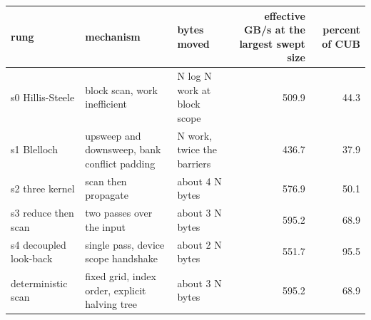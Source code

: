 \begin{tabular}{lllrr}
\toprule
rung & mechanism & bytes moved & effective GB/s at the largest swept size & percent of CUB \\
\midrule
s0 Hillis-Steele & block scan, work inefficient & N log N work at block scope & 509.9 & 44.3 \\
s1 Blelloch & upsweep and downsweep, bank conflict padding & N work, twice the barriers & 436.7 & 37.9 \\
s2 three kernel & scan then propagate & about 4 N bytes & 576.9 & 50.1 \\
s3 reduce then scan & two passes over the input & about 3 N bytes & 595.2 & 68.9 \\
s4 decoupled look-back & single pass, device scope handshake & about 2 N bytes & 551.7 & 95.5 \\
deterministic scan & fixed grid, index order, explicit halving tree & about 3 N bytes & 595.2 & 68.9 \\
\bottomrule
\end{tabular}
